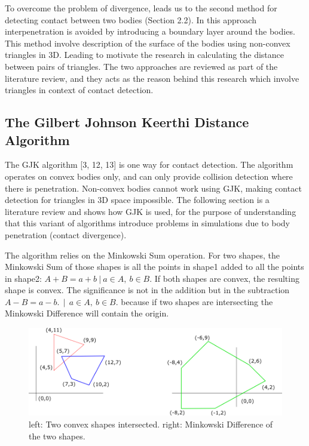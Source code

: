 \documentclass[times,12pt]{ACME2015article}
\begin{document}
To overcome the problem of divergence, leads us to the second method for detecting contact between two bodies (Section 2.2). In this approach interpenetration is avoided by introducing a boundary layer around the bodies. This method involve description of the surface of the bodies using non-convex triangles in 3D. Leading to motivate the research in calculating the distance between pairs of triangles. The two approaches are reviewed as part of the literature review, and they acts as the reason behind this research which involve triangles in context of contact detection.

\subsection{The Gilbert Johnson Keerthi Distance Algorithm}
The GJK algorithm [3, 12, 13] is one way for contact detection. The algorithm operates on convex bodies only, and can only provide collision detection where there is penetration. Non-convex bodies cannot work using GJK, making contact detection for triangles in 3D space impossible. The following section is a literature review and shows how GJK is used, for the purpose of understanding that this variant of algorithms introduce problems in simulations due to body penetration (contact divergence).

The algorithm relies on the Minkowski Sum operation. For two shapes, the Minkowski Sum of those shapes is all the points in shape1 added to all the points in shape2: $A + B = {a + b \:|\: a \in A, \: b \in B}$. If both shapes are convex, the resulting shape is convex. The significance is not in the addition but in the subtraction $A - B = {a - b. \:\:|\:\: a \in A, \: b \in B.}$ because if two shapes are intersecting the Minkowski Difference will contain the origin.

\begin{figure}[!h]
\centering
\includegraphics[width=1\textwidth]{gjkshapes} \protect\caption{\label{fig2}left: Two convex shapes intersected. right: Minkowski Difference of the two shapes.}
\end{figure} 
\end{document}
